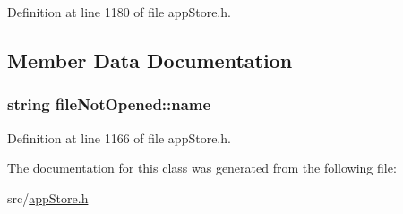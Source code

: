 Definition at line 1180 of file app\-Store.\-h.



\subsection{Member Data Documentation}
\hypertarget{classfile_not_opened_ae8cc2e233be82d6aeb8acb7d24de490d}{
\subsubsection[{name}]{\setlength{\rightskip}{0pt plus 5cm}string file\-Not\-Opened\-::name}}\label{classfile_not_opened_ae8cc2e233be82d6aeb8acb7d24de490d}


Definition at line 1166 of file app\-Store.\-h.



The documentation for this class was generated from the following file\-:\begin{DoxyCompactItemize}
\item 
src/\hyperlink{app_store_8h}{app\-Store.\-h}\end{DoxyCompactItemize}
